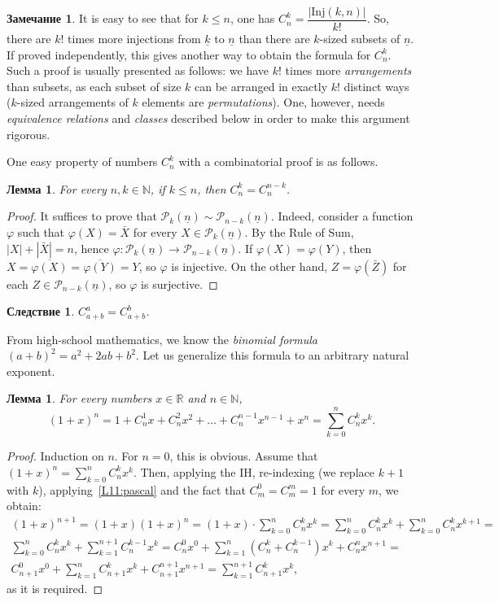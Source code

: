 \documentclass[12pt,notitlepage]{article}
\theoremstyle{plain}
\newtheorem{lemma}[thm]{Лемма}
\newtheorem{corr}[thm]{Следствие}
\theoremstyle{definition}
\newtheorem{rem}[thm]{Замечание}
\theoremstyle{plain}
\newcommand{\N}{\mathbb{N}}
\newcommand{\R}{\mathbb{R}}
\newcommand{\mP}{\mathcal{P}}
\renewcommand{\phi}{\varphi}
\newcommand{\ul}[1]{\underline{#1}}
\newcommand{\1}{\mathbf{1}}
\newcommand{\0}{\mathbf{0}}
\begin{document}
\begin{rem}
	It is easy to see that for $k \leq n$, one has $C_n^k = \dfrac{|\mathrm{Inj}(k,n)|}{k!}$. So, there are $k!$ times more injections from $\ul{k}$ to $\ul{n}$ than there are $k$-sized subsets of $\ul{n}$. If proved independently, this gives another way to obtain the formula for $C_n^k$. Such a proof is usually presented as follows: we have $k!$ times more \emph{arrangements} than subsets, as each subset of size $k$ can be arranged in exactly $k!$ distinct ways ($k$-sized arrangements of $k$ elements are \emph{permutations}). One, however, needs \emph{equivalence relations} and \emph{classes} described below in order to make this argument rigorous.
\end{rem}

\noindent One easy property of numbers $C_n^k$ with a combinatorial proof is as follows.
\begin{lemma}
	For every $n, k \in \N$, if $k \leq n$, then $C_n^k = C_n^{n-k}$.
\end{lemma}
\begin{proof}
	It suffices to prove that $\mP_k(\ul{n}) \sim \mP_{n - k}(\ul{n})$. Indeed, consider a function $\phi$ such that $\phi(X) = \bar X$ for every $X \in  \mP_k(\ul{n})$. By the Rule of Sum, $|X| + |\bar X| = n$, hence $\phi \colon\mP_k(\ul{n}) \to \mP_{n - k}(\ul{n})$. If $\phi(X) = \phi(Y)$, then $X = \overline{\phi(X)} = \overline{\phi(Y)} = Y$, so $\phi$ is injective. On the other hand, $Z = \phi(\bar Z)$ for each $Z \in \mP_{n - k}(\ul{n})$, so $\phi$ is surjective.
\end{proof}
\begin{corr}\label{L11:bin_add}
	$C_{a + b}^a = C_{a + b}^b$.
\end{corr}

From high-school mathematics, we know the \emph{binomial formula} $(a + b)^2 = a^2 + 2ab + b^2$. Let us generalize this formula to an arbitrary natural exponent.

\begin{lemma}\label{L11:binom_1}
	For every numbers $x \in \R$ and $n \in \N$,
	$$(1 + x)^n = 1 + C_n^1 x + C_n^2 x^2 + \ldots + C_n^{n-1}x^{n-1} + x^n = \sum_{k = 0}^n C_n^k x^k.$$
\end{lemma}
\begin{proof}
	Induction on $n$. For $n = 0$, this is obvious. Assume that $(1 + x)^n = \sum_{k = 0}^n C_n^k x^k$. Then, applying the IH, re-indexing (we replace $k + 1$ with $k$), applying~\ref{L11:pascal} and the fact that $C_m^0 = C_m^m = 1$ for every $m$, we obtain:
	\begin{multline*}
		(1 + x)^{n + 1} = (1 + x)(1 + x)^n =  (1 + x) \cdot \sum_{k = 0}^n C_n^k x^k = \sum_{k = 0}^n C_n^k x^k  + \sum_{k = 0}^n C_n^k x^{k + 1} =\\
		\sum_{k = 0}^n C_n^k x^k  + \sum_{k = 1}^{n+1} C_n^{k - 1} x^{k} =
		C_n^0 x^0 + \sum_{k = 1}^n (C_n^k + C_n^{k-1}) x^k + C_n^n x^{n+1} =\\
		C_{n+1}^0 x^0 + \sum_{k = 1}^n C_{n+1}^k x^k + C_{n+1}^{n+1} x^{n+1} = \sum_{k = 1}^{n+1} C_{n+1}^k x^k,
	\end{multline*}
	as it is required.
\end{proof}
\end{document}
